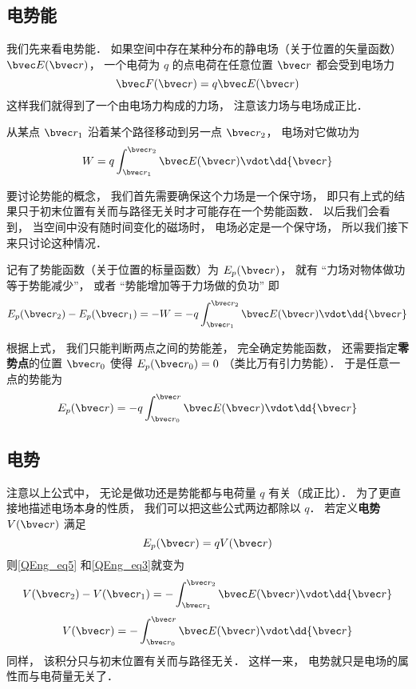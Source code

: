 

\subsection{电势能}
我们先来看电势能． 如果空间中存在某种分布的静电场（关于位置的矢量函数） $\bvec E(\bvec r)$， 一个电荷为 $q$ 的点电荷在任意位置 $\bvec r$ 都会受到电场力
\begin{equation}
\bvec F(\bvec r) = q \bvec E(\bvec r)
\end{equation}
这样我们就得到了一个由电场力构成的力场， 注意该力场与电场成正比． 

从某点 $\bvec r_1$ 沿着某个路径移动到另一点 $\bvec r_2$， 电场对它做功为
\begin{equation}\label{QEng_eq4}
W = q \int_{\bvec r_1}^{\bvec r_2} \bvec E(\bvec r) \vdot \dd{\bvec r}
\end{equation}

要讨论势能的概念， 我们首先需要确保这个力场是一个保守场， 即只有上式的结果只于初末位置有关而与路径无关时才可能存在一个势能函数． 以后我们会看到， 当空间中没有随时间变化的磁场时， 电场必定是一个保守场， %
所以我们接下来只讨论这种情况．

记有了势能函数（关于位置的标量函数）为 $E_p(\bvec r)$， 就有 “力场对物体做功等于势能减少”， 或者 “势能增加等于力场做的负功” 即
\begin{equation}\label{QEng_eq5}
E_p(\bvec r_2) - E_p(\bvec r_1) = -W = -q \int_{\bvec r_1}^{\bvec r_2} \bvec E(\bvec r) \vdot \dd{\bvec r}
\end{equation}

根据上式， 我们只能判断两点之间的势能差， 完全确定势能函数， 还需要指定\textbf{零势点}的位置 $\bvec r_0$ 使得 $E_p(\bvec r_0) = 0$ （类比万有引力势能）． 于是任意一点的势能为
\begin{equation}\label{QEng_eq3}
E_p(\bvec r) = -q \int_{\bvec r_0}^{\bvec r} \bvec E(\bvec r) \vdot \dd{\bvec r}
\end{equation}

\subsection{电势}
注意以上公式中， 无论是做功还是势能都与电荷量 $q$ 有关（成正比）． 为了更直接地描述电场本身的性质， 我们可以把这些公式两边都除以 $q$． 若定义\textbf{电势} $V(\bvec r)$ 满足
\begin{equation}
E_p(\bvec r) = q V(\bvec r)
\end{equation}
则\autoref{QEng_eq5} 和\autoref{QEng_eq3}就变为
\begin{equation}\label{QEng_eq1}
V(\bvec r_2) - V(\bvec r_1) = - \int_{\bvec r_1}^{\bvec r_2} \bvec E(\bvec r) \vdot \dd{\bvec r}
\end{equation}
\begin{equation}
V(\bvec r) = -\int_{\bvec r_0}^{\bvec r} \bvec E(\bvec r) \vdot \dd{\bvec r}
\end{equation}
同样， 该积分只与初末位置有关而与路径无关． 这样一来， 电势就只是电场的属性而与电荷量无关了．

